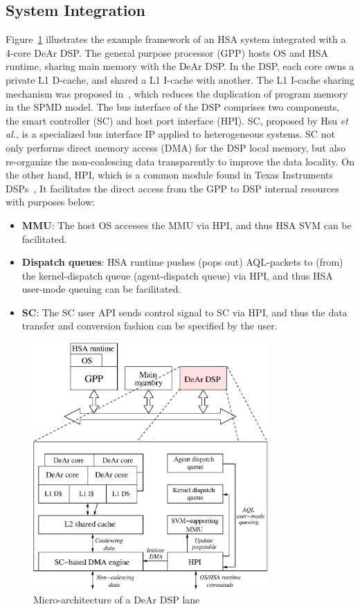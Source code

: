\subsection{System Integration}
Figure~\ref{fig:archi} illustrates the example framework of an HSA system integrated with a 4-core DeAr DSP.
The general purpose processor (GPP) hosts OS and HSA runtime, sharing main memory with the DeAr DSP.
In the DSP, each core owns a private L1 D-cache, and shared a L1 I-cache with another.
The L1 I-cache sharing mechanism was proposed in~\cite{kelly2004shared},
which reduces the duplication of program memory in the SPMD model.
The bus interface of the DSP comprises two components, the smart controller (SC) and host port interface (HPI).
SC, proposed by Hsu \textit{et al.}, is a specialized bus interface IP applied to heterogeneous systems.
SC not only performs direct memory access (DMA) for the DSP local memory,
but also re-organize the non-coalescing data transparently to improve the data locality.
On the other hand, HPI, which is a common module found in Texas Instruments DSPs~\cite{hpi},
It facilitates the direct access from the GPP to DSP internal resources with purposes below:
\begin{itemize}
    \item \textbf{MMU}: The host OS accesses the MMU via HPI, and thus HSA SVM can be facilitated.
    \item \textbf{Dispatch queues}: HSA runtime pushes (pops out) AQL-packets to (from) the kernel-dispatch queue (agent-dispatch queue) via HPI, 
        and thus HSA user-mode queuing can be facilitated.
    \item \textbf{SC}: The SC user API sends control signal to SC via HPI, 
        and thus the data transfer and conversion fashion can be specified by the user.
\end{itemize}




\vspace{\textfig}
\begin{figure}[!ht] 
    \centering
    \includegraphics[width=0.8\textwidth]{./figs/archi.eps}
    \caption{Micro-architecture of a DeAr DSP lane}
    \label{fig:archi}
\end{figure}


